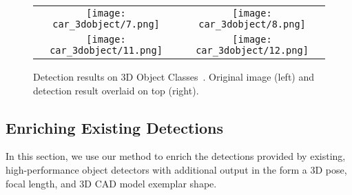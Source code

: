 \begin{figure}[h]
    \begin{center}
    \setlength\tabcolsep{0pt}
\begin{tabular}{cc}
  \texttt{[image: car\_3dobject/7.png]} &   
  \texttt{[image: car\_3dobject/8.png]}\\ [-15pt]
  \texttt{[image: car\_3dobject/11.png]} &   
  \texttt{[image: car\_3dobject/12.png]}\\ [-5pt]
\end{tabular}
\end{center}
\caption{Detection results on 3D Object
  Classes~\cite{Savarese07}. Original image (left) and detection
  result overlaid on top (right).}%
  \label{fig:3dobject_vis}
\end{figure}


% 

\subsection{Enriching Existing Detections}
\label{sec:exp_enrich}
In this section, we use our method to enrich the detections provided
by existing, high-performance object detectors with additional output
in the form a 3D pose, focal length, and 3D CAD model exemplar shape.

